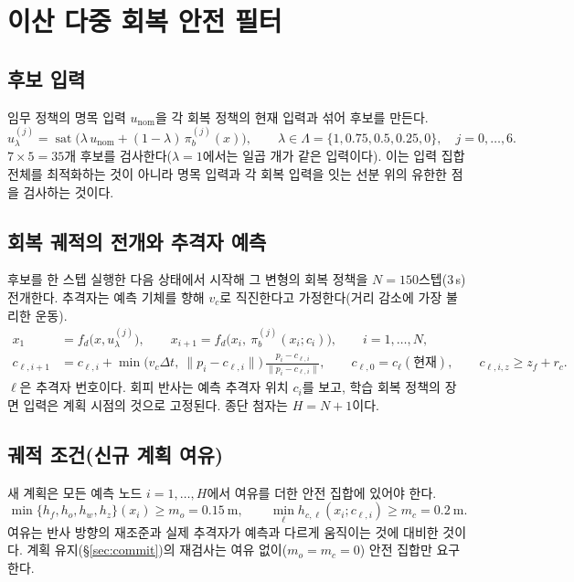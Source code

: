 \documentclass[10pt,a4paper]{article}
\newcommand{\sat}{\operatorname{sat}}
\newcommand{\unom}{u_{\mathrm{nom}}}
\begin{document}
\section{이산 다중 회복 안전 필터}\label{sec:filter}



\subsection{후보 입력}
임무 정책의 명목 입력 $\unom$을 각 회복 정책의 현재 입력과 섞어 후보를 만든다.
\begin{equation}
u^{(j)}_\lambda=\sat\big(\lambda\,\unom+(1-\lambda)\,\pi_b^{(j)}(x)\big),\qquad \lambda\in\Lambda=\{1,0.75,0.5,0.25,0\},\quad j=0,\dots,6 .
\label{eq:cand}
\end{equation}
$7\times5=35$개 후보를 검사한다($\lambda=1$에서는 일곱 개가 같은 입력이다).
이는 입력 집합 전체를 최적화하는 것이 아니라 명목 입력과 각 회복 입력을 잇는 선분 위의 유한한 점을 검사하는 것이다.

\subsection{회복 궤적의 전개와 추격자 예측}
후보를 한 스텝 실행한 다음 상태에서 시작해 그 변형의 회복 정책을 $N=150$스텝(3\,s) 전개한다. 추격자는 예측 기체를 향해 $v_c$로 직진한다고 가정한다(거리 감소에 가장 불리한 운동).
\begin{align}
x_1&=f_d\big(x,u^{(j)}_\lambda\big),\qquad x_{i+1}=f_d\big(x_i,\ \pi_b^{(j)}(x_i;c_i)\big),\qquad i=1,\dots,N, \label{eq:rollout}\\
c_{\ell,i+1}&=c_{\ell,i}+\min\!\big(v_c\Delta t,\ \|p_i-c_{\ell,i}\|\big)\,\frac{p_i-c_{\ell,i}}{\|p_i-c_{\ell,i}\|},\qquad c_{\ell,0}=c_\ell(\text{현재}),\qquad c_{\ell,i,z}\ge z_f+r_c . \label{eq:pursue}
\end{align}
$\ell$은 추격자 번호이다. 회피 반사는 예측 추격자 위치 $c_i$를 보고, 학습 회복 정책의 장면 입력은 계획 시점의 것으로 고정된다. 종단 첨자는 $H=N+1$이다.

\subsection{궤적 조건(신규 계획 여유)}
새 계획은 모든 예측 노드 $i=1,\dots,H$에서 여유를 더한 안전 집합에 있어야 한다.
\begin{equation}
\min\{h_f,h_o,h_w,h_z\}(x_i)\ge m_o=0.15\ \mathrm m,\qquad \min_\ell h_{c,\ell}(x_i;c_{\ell,i})\ge m_c=0.2\ \mathrm m .
\label{eq:fresh}
\end{equation}
여유는 반사 방향의 재조준과 실제 추격자가 예측과 다르게 움직이는 것에 대비한 것이다. 계획 유지(\S\ref{sec:commit})의 재검사는 여유 없이($m_o=m_c=0$) 안전 집합만 요구한다.
\end{document}
